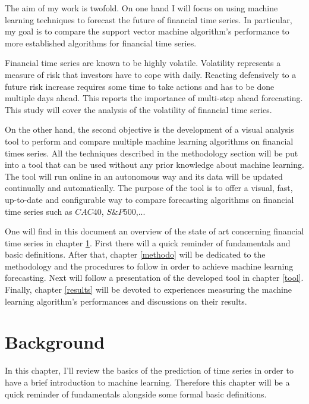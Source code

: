 \documentclass[11pt,a4paper,oneside]{book}
\begin{document}
The aim of my work is twofold. On one hand I will focus on using machine learning techniques to forecast the future of financial time series. In particular, my goal is to compare the support vector machine algorithm's performance to more established algorithms for financial time series. 

Financial time series are known to be highly volatile. Volatility represents a measure of risk that investors have to cope with daily. Reacting defensively to a future risk increase requires some time to take actions and has to be done multiple days ahead. This reports the importance of multi-step ahead forecasting.  This study will cover the analysis of the volatility of financial time series.

On the other hand, the second objective is the development of a visual analysis tool to perform and compare multiple machine learning algorithms on financial times series. All the techniques described in the methodology section will be put into a tool that can be used without any prior knowledge about machine learning. The tool will run online in an autonomous way and its data will be updated continually and automatically. The purpose of the tool is to offer a visual, fast, up-to-date and configurable way to compare forecasting algorithms on financial time series such as $CAC40$, $S\&P 500$,...

One will find in this document an overview of the state of art concerning financial time series in chapter \ref{backgr}. First there will a quick reminder of fundamentals and basic definitions. After that, chapter \ref{methodo} will be dedicated to the methodology and the procedures to follow in order to achieve machine learning forecasting. Next will follow a presentation of the developed tool in chapter \ref{tool}. Finally, chapter \ref{results} will be devoted to experiences measuring the machine learning algorithm's performances and discussions on their results.




\chapter{Background} \label{backgr}

In this chapter, I'll review the basics of the prediction of time series in order to have a brief introduction to machine learning. Therefore this chapter will be a quick reminder of fundamentals alongside some formal basic definitions. 
\end{document}
